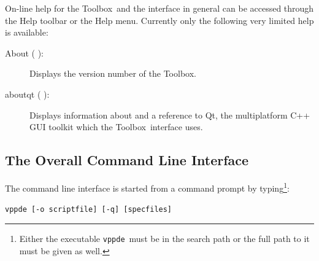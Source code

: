 \documentclass[\pformat,12pt]{article}
\newcommand{\Toolbox}{Toolbox}
\newcommand{\vdmde}{vppde}
\newcommand{\guicmd}[1]{{\sf #1}}
\begin{document}

On-line help for the \Toolbox\ and the interface in general can %
be accessed through the \guicmd{Help} toolbar or the \guicmd{Help}
menu. Currently only the following very limited help is available:


\begin{description}
 \item[\guicmd{About} (\hspace{-1.8mm}
):]
  Displays the version number of the \Toolbox.

 \item[\guicmd{aboutqt}  (\hspace{-1.8mm}
):]
  Displays information about and a reference to Qt, the multiplatform
  C++ GUI toolkit which the \Toolbox\ interface uses.


\end{description}


\subsection{The Overall Command Line Interface}\label{subsec:maincommand}

The command line interface is started from a command prompt by
typing\footnote{Either the executable {\tt \vdmde}\ must be in the
  search path or the full path to it must be given as well.}:

{\tt \vdmde\ [-o scriptfile] [-q] [specfiles]}
\end{document}
